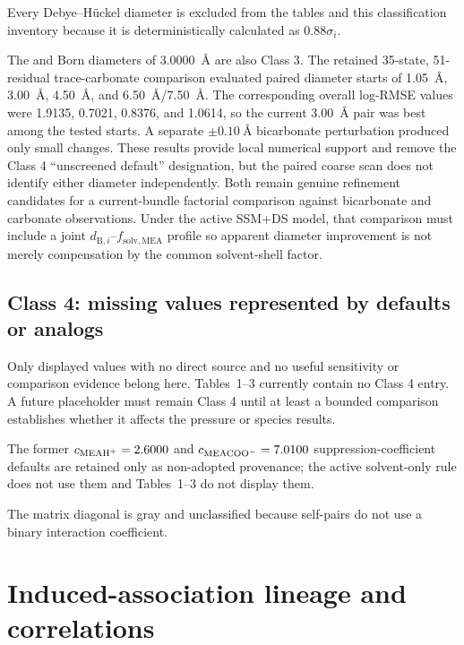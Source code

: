 \documentclass[10pt,oneside]{scrartcl}
\begin{document}
Every Debye--H\"uckel diameter is excluded from the tables and this
classification inventory because it is deterministically calculated as
$0.88\sigma_i$.

The  and  Born diameters of
\SI{3.0000}{\angstrom} are also Class 3. The retained 35-state, 51-residual
trace-carbonate comparison evaluated paired diameter starts of
\SI{1.05}{\angstrom}, \SI{3.00}{\angstrom}, \SI{4.50}{\angstrom}, and
\SI{6.50}{\angstrom}/\SI{7.50}{\angstrom}. The corresponding overall
log-RMSE values were 1.9135, 0.7021, 0.8376, and 1.0614, so the current
\SI{3.00}{\angstrom} pair was best among the tested starts. A separate
$\pm\SI{0.10}{\angstrom}$ bicarbonate perturbation produced only small changes.
These results provide local numerical support and remove the Class 4
``unscreened default'' designation, but the paired coarse scan does not identify
either diameter independently. Both remain genuine refinement candidates for
a current-bundle factorial comparison against bicarbonate and carbonate
observations. Under the active SSM+DS model, that comparison must include a
joint $d_{\mathrm B,i}$--$f_{\mathrm{solv},\mathrm{MEA}}$ profile so apparent
diameter improvement is not merely compensation by the common solvent-shell
factor.

\subsection{Class 4: missing values represented by defaults or analogs}

Only displayed values with no direct source and no useful sensitivity or
comparison evidence belong here. Tables~1--3 currently contain no Class 4
entry. A future placeholder must remain Class 4 until at least a bounded
comparison establishes whether it affects the pressure or species results.

The former $c_{\ce{MEAH+}}=2.6000$ and
$c_{\ce{MEACOO-}}=7.0100$ suppression-coefficient defaults are retained only
as non-adopted provenance; the active solvent-only rule does not use them and
Tables~1--3 do not display them.

The matrix diagonal is gray and unclassified because self-pairs do not use a
binary interaction coefficient.

\section{Induced-association lineage and correlations}
\end{document}
